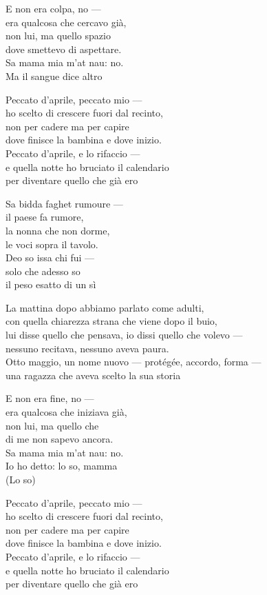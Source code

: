 \begin{lyrics}
E non era colpa, no —\\
era qualcosa che cercavo già,\\
non lui, ma quello spazio\\
dove smettevo di aspettare.\\
Sa mama mia m'at nau: no.\\
Ma il sangue dice altro

Peccato d'aprile, peccato mio —\\
ho scelto di crescere fuori dal recinto,\\
non per cadere ma per capire\\
dove finisce la bambina e dove inizio.\\
Peccato d'aprile, e lo rifaccio —\\
e quella notte ho bruciato il calendario\\
per diventare quello che già ero

Sa bidda faghet rumoure —\\
il paese fa rumore,\\
la nonna che non dorme,\\
le voci sopra il tavolo.\\
Deo so issa chi fui —\\
solo che adesso so\\
il peso esatto di un sì

La mattina dopo abbiamo parlato come adulti,\\
con quella chiarezza strana che viene dopo il buio,\\
lui disse quello che pensava, io dissi quello che volevo —\\
nessuno recitava, nessuno aveva paura.\\
Otto maggio, un nome nuovo — protégée, accordo, forma —\\
una ragazza che aveva scelto la sua storia

E non era fine, no —\\
era qualcosa che iniziava già,\\
non lui, ma quello che\\
di me non sapevo ancora.\\
Sa mama mia m'at nau: no.\\
Io ho detto: lo so, mamma\\
(Lo so)

Peccato d'aprile, peccato mio —\\
ho scelto di crescere fuori dal recinto,\\
non per cadere ma per capire\\
dove finisce la bambina e dove inizio.\\
Peccato d'aprile, e lo rifaccio —\\
e quella notte ho bruciato il calendario\\
per diventare quello che già ero


\end{lyrics}
